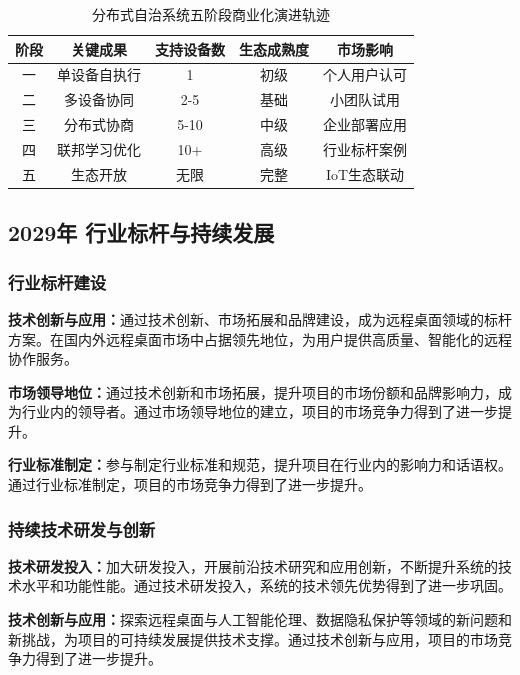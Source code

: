 \documentclass[12pt,a4paper]{article}
\begin{document}
\begin{table}[H]
\centering
\small
\begin{tabular}{|c|c|c|c|c|}
\hline
\textbf{阶段} & \textbf{关键成果} & \textbf{支持设备数} & \textbf{生态成熟度} & \textbf{市场影响} \\
\hline
一 & 单设备自执行 & 1 & 初级 & 个人用户认可 \\
\hline
二 & 多设备协同 & 2-5 & 基础 & 小团队试用 \\
\hline
三 & 分布式协商 & 5-10 & 中级 & 企业部署应用 \\
\hline
四 & 联邦学习优化 & 10+ & 高级 & 行业标杆案例 \\
\hline
五 & 生态开放 & 无限 & 完整 & IoT生态联动 \\
\hline
\end{tabular}
\caption{分布式自治系统五阶段商业化演进轨迹}
\end{table}

\subsection{2029年 行业标杆与持续发展}

\subsubsection{行业标杆建设}
\textbf{技术创新与应用：}通过技术创新、市场拓展和品牌建设，成为远程桌面领域的标杆方案。在国内外远程桌面市场中占据领先地位，为用户提供高质量、智能化的远程协作服务。

\textbf{市场领导地位：}通过技术创新和市场拓展，提升项目的市场份额和品牌影响力，成为行业内的领导者。通过市场领导地位的建立，项目的市场竞争力得到了进一步提升。

\textbf{行业标准制定：}参与制定行业标准和规范，提升项目在行业内的影响力和话语权。通过行业标准制定，项目的市场竞争力得到了进一步提升。

\subsubsection{持续技术研发与创新}
\textbf{技术研发投入：}加大研发投入，开展前沿技术研究和应用创新，不断提升系统的技术水平和功能性能。通过技术研发投入，系统的技术领先优势得到了进一步巩固。

\textbf{技术创新与应用：}探索远程桌面与人工智能伦理、数据隐私保护等领域的新问题和新挑战，为项目的可持续发展提供技术支撑。通过技术创新与应用，项目的市场竞争力得到了进一步提升。
\end{document}
